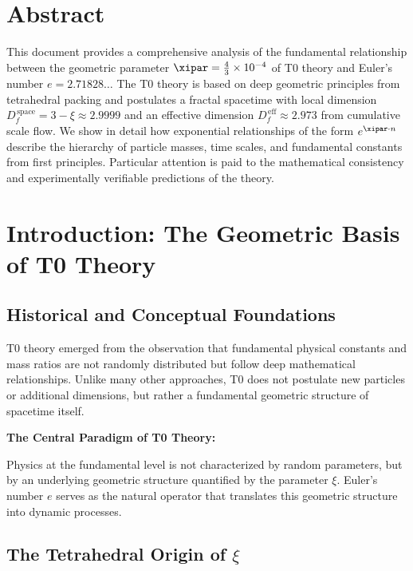 \section*{Abstract}
		This document provides a comprehensive analysis of the fundamental relationship between the geometric parameter $\xipar = \frac{4}{3} \times 10^{-4}$ of T0 theory and Euler's number $e = 2.71828\ldots$ The T0 theory is based on deep geometric principles from tetrahedral packing and postulates a fractal spacetime with local dimension $D_f^{\,\text{space}} = 3 - \xi \approx 2.9999$ and an effective dimension $D_f^{\,\text{eff}} \approx 2.973$ from cumulative scale flow. We show in detail how exponential relationships of the form $e^{\xipar \cdot n}$ describe the hierarchy of particle masses, time scales, and fundamental constants from first principles. Particular attention is paid to the mathematical consistency and experimentally verifiable predictions of the theory.

	
	
	\section{Introduction: The Geometric Basis of T0 Theory}
	
	\subsection{Historical and Conceptual Foundations}
	
	T0 theory emerged from the observation that fundamental physical constants and mass ratios are not randomly distributed but follow deep mathematical relationships. Unlike many other approaches, T0 does not postulate new particles or additional dimensions, but rather a fundamental geometric structure of spacetime itself.
	
	\begin{insight}
		\textbf{The Central Paradigm of T0 Theory:}
		
		Physics at the fundamental level is not characterized by random parameters, but by an underlying geometric structure quantified by the parameter $\xi$. Euler's number $e$ serves as the natural operator that translates this geometric structure into dynamic processes.
	\end{insight}
	
	\subsection{The Tetrahedral Origin of $\xi$}
	
